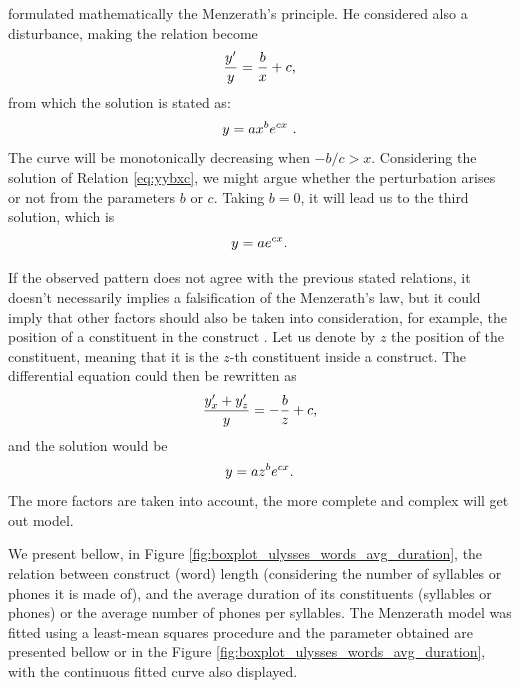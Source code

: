 \cite{altmann1980}
formulated mathematically the Menzerath's principle.
He considered also a disturbance, making the relation become
\begin{equation}
\frac{y'}{y} = \frac{b}{x} + c \textmd{,}
\label{eq:yybxc}
\end{equation} 
from which the solution is stated as:
\begin{equation}
y = a x^b  e^{c x} \textmd{ .}
\end{equation}
The curve will be monotonically decreasing when $-b/c > x$.
Considering the solution of Relation \ref{eq:yybxc}, we might argue whether
the perturbation arises or not from the parameters $b$ or $c$. Taking 
$b=0$, it will lead us to the third solution, which is
\begin{equation}
y = a e^{cx} \textmd{.}
\end{equation}

If the observed pattern does not agree with the previous stated relations,
it doesn't necessarily implies a falsification of the Menzerath's law, but 
it could imply that other factors should also be taken into consideration,
for example, the position of a constituent in the construct \cite{altmann1989}.
Let us denote by $z$ the position of the constituent, meaning that it is
the $z$-th constituent inside a construct. The differential equation could 
then be rewritten as
\begin{equation}
\frac{y_x' + y_z'}{y} = - \frac{b}{z} + c \textmd{,}
\end{equation}
and the solution would be
\begin{equation}
y = az^b e^{cx} \textmd{.}
\end{equation}
The more factors are taken into account, the more complete and complex will get out
model.



We present bellow, in Figure \ref{fig:boxplot_ulysses_words_avg_duration}, the relation
between construct (word) length (considering the number of syllables or phones it is made of), and
the average duration of its constituents (syllables or phones) or the average number of phones per syllables.
The Menzerath model was fitted using a least-mean squares procedure and the parameter obtained are 
presented bellow or in the Figure \ref{fig:boxplot_ulysses_words_avg_duration}, 
with the continuous fitted curve also displayed.

